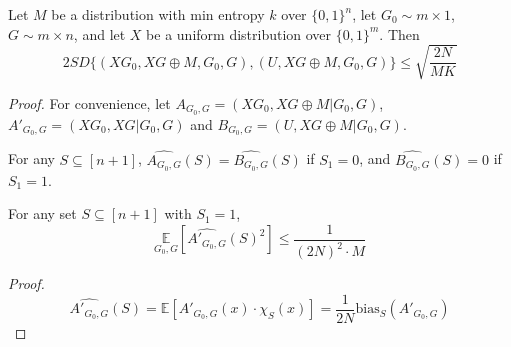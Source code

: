\begin{theorem}
Let $M$ be a distribution with min entropy $k$ over $\{0 , 1 \}^n$, let $G_0 \sim m \times 1$, $G \sim m \times n$, and let $X$ be a uniform distribution over $\{ 0, 1 \} ^ m$. Then 
$$2SD \{ (XG_0, XG \oplus M, G_0, G), (U, XG \oplus M, G_0, G) \} \leq 
\sqrt{\frac{2N}{MK}}$$
\end{theorem}

\begin{proof}
For convenience, let $A_{G_0, G} = (XG_0, XG \oplus M | G_0 , G)$, 
$A'_{G_0,G} = (XG_0, XG | G_0 , G) $ and
$B_{G_0,G} = (U, XG \oplus M | G_0 , G)$.

\begin{claim}
For any $S \subseteq [n+1]$, $\widehat{A_{G_0,G}}(S) = \widehat{B_{G_0,G}}(S)$ if $S_1 = 0$, and 
$\widehat{B_{G_0,G}}(S) = 0$ if $S_1 = 1$.
\end{claim} 

\begin{claim}
For any set $S \subseteq [n+1]$ with $S_1 =1$, 
$$\underset{G_0, G} {\mathbb{E}} 
	[\widehat{A'_{G_0,G}}(S)^2] \leq \frac{1}{(2N)^2 \cdot M} $$
\end{claim}

\noindent \textit{Proof.}
$$ \widehat{A'_{G_0,G}}(S) = \mathbb{E}[A'_{G_0,G}(x) \cdot \chi_S(x)]
= \frac{1}{2N} \text{bias}_S(A'_{G_0, G})$$


\end{proof}
